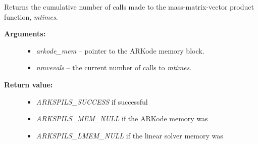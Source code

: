\documentclass[letterpaper,10pt,english]{sphinxmanual}
\begin{document}
\begin{fulllineitems}
\label{c_interface/User_callable:c.ARKSpilsGetNumMtimesEvals}
Returns the cumulative number of calls made to the
mass-matrix-vector product function, \emph{mtimes}.
\begin{description}
\item[{\textbf{Arguments:}}] \leavevmode\begin{itemize}
\item {} 
\emph{arkode\_mem} -- pointer to the ARKode memory block.

\item {} 
\emph{nmvevals} -- the current number of calls to \emph{mtimes}.

\end{itemize}

\item[{\textbf{Return value:}}] \leavevmode\begin{itemize}
\item {} 
\emph{ARKSPILS\_SUCCESS} if successful

\item {} 
\emph{ARKSPILS\_MEM\_NULL} if the ARKode memory was 

\item {} 
\emph{ARKSPILS\_LMEM\_NULL} if the linear solver memory was 

\end{itemize}

\end{description}

\end{fulllineitems}

\end{document}
